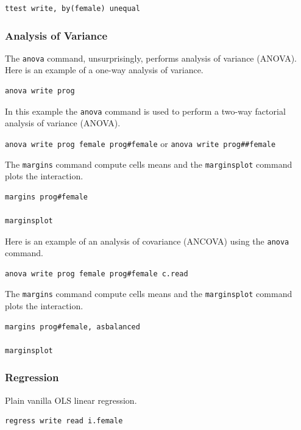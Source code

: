 \documentclass{article}
\begin{document}
\begin{lstlisting}
ttest write, by(female) unequal
\end{lstlisting}


\subsubsection{Analysis of Variance}

The \lstinline{anova} command, unsurprisingly, performs analysis of variance (ANOVA). Here is an example of a one-way analysis of variance.

\begin{lstlisting}
anova write prog
\end{lstlisting}

In this example the \lstinline{anova} command is used to perform a two-way factorial analysis of variance (ANOVA).

\lstinline{anova write prog female prog#female}
or
\lstinline{anova write prog##female}

The \lstinline{margins} command compute cells means and the \lstinline{marginsplot} command plots the interaction.

\begin{lstlisting}
margins prog#female

marginsplot
\end{lstlisting}

Here is an example of an analysis of covariance (ANCOVA) using the \lstinline{anova} command.

\begin{lstlisting}
anova write prog female prog#female c.read
\end{lstlisting}

The \lstinline{margins} command compute cells means and the \lstinline{marginsplot} command plots the interaction.

\begin{lstlisting}
margins prog#female, asbalanced

marginsplot
\end{lstlisting}

\subsubsection{Regression}

Plain vanilla OLS linear regression.

\begin{lstlisting}
regress write read i.female
\end{lstlisting}
\end{document}
